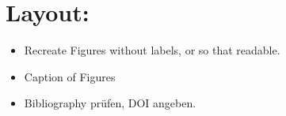\section{Layout:}
\begin{itemize}
    \item Recreate Figures without labels, or so that readable.
    \item Caption of Figures
    \item Bibliography prüfen, DOI angeben.
\end{itemize}


\clearpage



